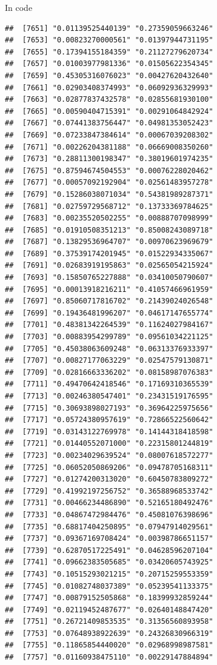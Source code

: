 \documentclass[ignorenonframetext,]{beamer}
\begin{document}
\begin{frame}[fragile]{In code}
\begin{verbatim}
##  [7651] "0.01139525440139" "0.27359059663246"
##  [7653] "0.00823270000561" "0.01397944731195"
##  [7655] "0.17394155184359" "0.21127279620734"
##  [7657] "0.01003977981336" "0.01505622354345"
##  [7659] "0.45305316076023" "0.00427620432640"
##  [7661] "0.02903408374993" "0.06092936329993"
##  [7663] "0.02877837432578" "0.02855681930100"
##  [7665] "0.00590404715391" "0.00291064842924"
##  [7667] "0.07441383756447" "0.04981353052423"
##  [7669] "0.07233847384614" "0.00067039208302"
##  [7671] "0.00226204381188" "0.06669008350260"
##  [7673] "0.28811300198347" "0.38019601974235"
##  [7675] "0.87594674504553" "0.00076228020462"
##  [7677] "0.00057092192904" "0.02561483957278"
##  [7679] "0.15286038071034" "0.54381989287371"
##  [7681] "0.02759729568712" "0.13733369784625"
##  [7683] "0.00235520502255" "0.00888707098999"
##  [7685] "0.01910508351213" "0.85008243089718"
##  [7687] "0.13829536964707" "0.00970623969679"
##  [7689] "0.37539174201945" "0.01522934335067"
##  [7691] "0.02683919195863" "0.02565054215924"
##  [7693] "0.15850765227888" "0.03410050790607"
##  [7695] "0.00013918216211" "0.41057466961959"
##  [7697] "0.85060717816702" "0.21439024026548"
##  [7699] "0.19436481996207" "0.04617147655774"
##  [7701] "0.48381342264539" "0.11624027984167"
##  [7703] "0.00883954299789" "0.09561034221125"
##  [7705] "0.45038063609248" "0.06313376933397"
##  [7707] "0.00827177063229" "0.02547579130871"
##  [7709] "0.02816663336202" "0.08158987076383"
##  [7711] "0.49470642418546" "0.17169310365539"
##  [7713] "0.00246380547401" "0.23431519176595"
##  [7715] "0.30693898027193" "0.36964225975656"
##  [7717] "0.05724380957619" "0.72866522560642"
##  [7719] "0.03143122769978" "0.14144318418598"
##  [7721] "0.01440552071000" "0.22315801244819"
##  [7723] "0.00234029639524" "0.08007618572277"
##  [7725] "0.06052050869206" "0.09478705168311"
##  [7727] "0.01274200313020" "0.60450783809272"
##  [7729] "0.41992197256752" "0.36588968533742"
##  [7731] "0.00466234486890" "0.52165180492476"
##  [7733] "0.04867472984476" "0.45081076398696"
##  [7735] "0.68817404250895" "0.07947914029561"
##  [7737] "0.09367169708424" "0.00398786651157"
##  [7739] "0.62870517225491" "0.04628596207104"
##  [7741] "0.09662383505685" "0.03420605743925"
##  [7743] "0.10515293021215" "0.20715259553359"
##  [7745] "0.01082748037389" "0.05239541133375"
##  [7747] "0.00879152505868" "0.18399932859244"
##  [7749] "0.02119452487677" "0.02640148847420"
##  [7751] "0.26721409853535" "0.31356560893958"
##  [7753] "0.07648938922639" "0.24326830966319"
##  [7755] "0.11865854440020" "0.02968998987581"
##  [7757] "0.01160938475110" "0.00229147884894"

\end{verbatim}
\end{frame}
\end{document}
